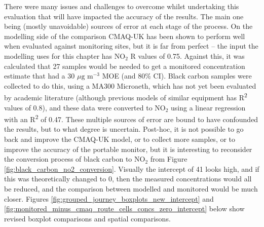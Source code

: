 There were many issues and challenges to overcome whilst undertaking this evaluation that will have impacted the accuracy of the results. The main one being (mostly unavoidable) sources of error at each stage of the process. On the modelling side of the comparison CMAQ-UK has been shown to perform well when evaluated against monitoring sites, but it is far from perfect – the input the modelling uses for this chapter has NO$_{2}$ R values of 0.75. Against this, it was calculated that 27 samples would be needed to get a monitored concentration estimate that had a 30 $\mu \text{g m}^{-3}$ MOE (and 80\% CI). Black carbon samples were collected to do this, using a MA300 Microaeth, which has not yet been evaluated by academic literature (although previous models of similar equipment has R\textsuperscript{2} values of 0.8), and these data were converted to NO$_{2}$ using a linear regression with an R\textsuperscript{2} of 0.47. These multiple sources of error are bound to have confounded the results, but to what degree is uncertain. Post-hoc, it is not possible to go back and improve the CMAQ-UK model, or to collect more samples, or to improve the accuracy of the portable monitor, but it is interesting to reconsider the conversion process of black carbon to NO$_{2}$ from Figure \ref{fig:black_carbon_no2_conversion}. Visually the intercept of 41 looks high, and if this was theoretically changed to 0, then the measured concentrations would all be reduced, and the comparison between modelled and monitored would be much closer. Figures \ref{fig:grouped_journey_boxplots_new_intercept} and \ref{fig:monitored_minus_cmaq_route_cells_concs_zero_intercept} below show revised boxplot comparisons and spatial comparisons.




